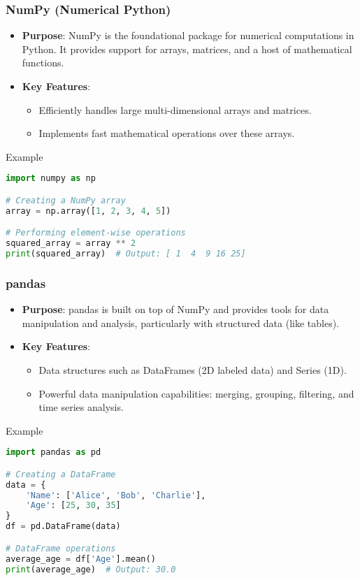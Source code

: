 \documentclass{beamer}
\begin{document}
\begin{frame}[fragile]
    \frametitle{NumPy (Numerical Python)}
    \begin{itemize}
        \item \textbf{Purpose}: NumPy is the foundational package for numerical computations in Python. It provides support for arrays, matrices, and a host of mathematical functions.
        \item \textbf{Key Features}:
        \begin{itemize}
            \item Efficiently handles large multi-dimensional arrays and matrices.
            \item Implements fast mathematical operations over these arrays.
        \end{itemize}
    \end{itemize}
    
    \begin{block}{Example}
        \begin{lstlisting}[language=Python]
import numpy as np

# Creating a NumPy array
array = np.array([1, 2, 3, 4, 5])

# Performing element-wise operations
squared_array = array ** 2
print(squared_array)  # Output: [ 1  4  9 16 25]
        \end{lstlisting}
    \end{block}
\end{frame}

\begin{frame}[fragile]
    \frametitle{pandas}
    \begin{itemize}
        \item \textbf{Purpose}: pandas is built on top of NumPy and provides tools for data manipulation and analysis, particularly with structured data (like tables).
        \item \textbf{Key Features}:
        \begin{itemize}
            \item Data structures such as DataFrames (2D labeled data) and Series (1D).
            \item Powerful data manipulation capabilities: merging, grouping, filtering, and time series analysis.
        \end{itemize}
    \end{itemize}
    
    \begin{block}{Example}
        \begin{lstlisting}[language=Python]
import pandas as pd

# Creating a DataFrame
data = {
    'Name': ['Alice', 'Bob', 'Charlie'],
    'Age': [25, 30, 35]
}
df = pd.DataFrame(data)

# DataFrame operations
average_age = df['Age'].mean()
print(average_age)  # Output: 30.0
        \end{lstlisting}
    \end{block}
\end{frame}
\end{document}
